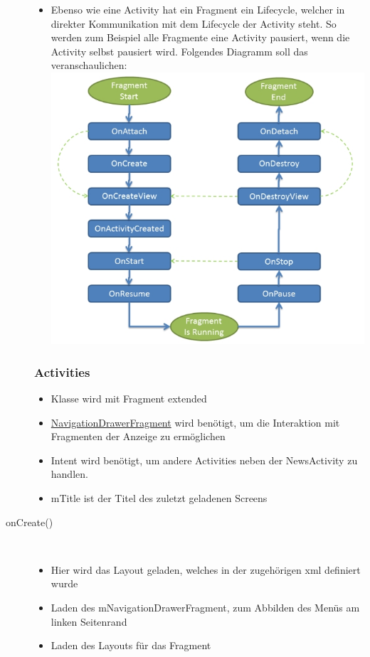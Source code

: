 \begin{description}
\begin{itemize}
\item Ebenso wie eine Activity hat ein Fragment ein Lifecycle, welcher in direkter Kommunikation mit dem Lifecycle der Activity steht. So werden zum Beispiel alle Fragmente eine Activity pausiert, wenn die Activity selbst pausiert wird. Folgendes Diagramm soll das veranschaulichen:\\
\includegraphics[scale=0.8]{05_Handbuch/img/LifeCycle_Fragment.jpg}
\end{itemize}

\newpage

\subsubsection{Activities}
\label{newsactitvity}
\begin{itemize}
\item Klasse wird mit Fragment extended
\item \hyperref[NavigationDrawerFragment]{NavigationDrawerFragment} wird benötigt, um die Interaktion mit Fragmenten der Anzeige zu ermöglichen
\item Intent wird benötigt, um andere Activities neben der NewsActivity zu handlen.
\item mTitle ist der Titel des zuletzt geladenen Screens
\end{itemize}

 
\item[onCreate()]~\par
\begin{itemize}
\item Hier wird das Layout geladen, welches in der zugehörigen xml definiert wurde
\item Laden des mNavigationDrawerFragment, zum Abbilden des Menüs am linken Seitenrand
\item Laden des Layouts für das Fragment
 

\end{itemize}
\end{description}
